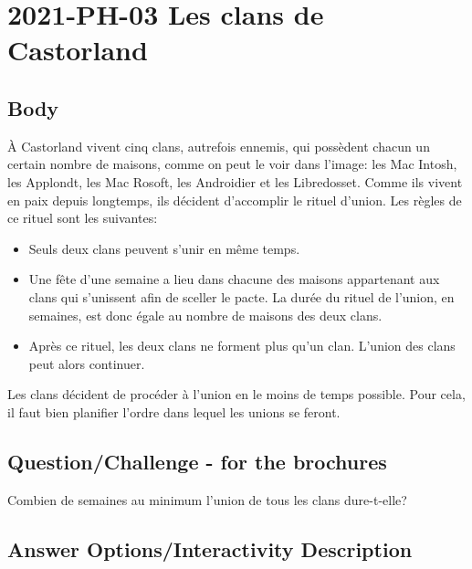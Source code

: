\documentclass[a4paper,11pt]{report}
\newcommand{\taskGraphicsFolder}{..}
\begin{document}
\section*{\centering{} 2021-PH-03 Les clans de Castorland}


\subsection*{Body}

À Castorland vivent cinq clans, autrefois ennemis, qui possèdent chacun un certain nombre de maisons, comme on peut le voir dans l’image: les Mac Intosh, les Applondt, les Mac Rosoft, les Androidier et les Libredosset. Comme ils vivent en paix depuis longtemps, ils décident d’accomplir le rituel d’union. Les règles de ce rituel sont les suivantes:

\begin{itemize}
  \item Seuls deux clans peuvent s’unir en même temps.
  \item Une fête d’une semaine a lieu dans chacune des maisons appartenant aux clans qui s’unissent afin de sceller le pacte. La durée du rituel de l’union, en semaines, est donc égale au nombre de maisons des deux clans.
  \item Après ce rituel, les deux clans ne forment plus qu’un clan. L’union des clans peut alors continuer.
\end{itemize}

Les clans décident de procéder à l’union en le moins de temps possible. Pour cela, il faut bien planifier l’ordre dans lequel les unions se feront.

{\centering%
\par}

{\em


\subsection*{Question/Challenge - for the brochures}

Combien de semaines au minimum l’union de tous les clans dure-t-elle?

}

\begingroup
\renewcommand{\arraystretch}{1.5}
\subsection*{Answer Options/Interactivity Description}
\end{document}
